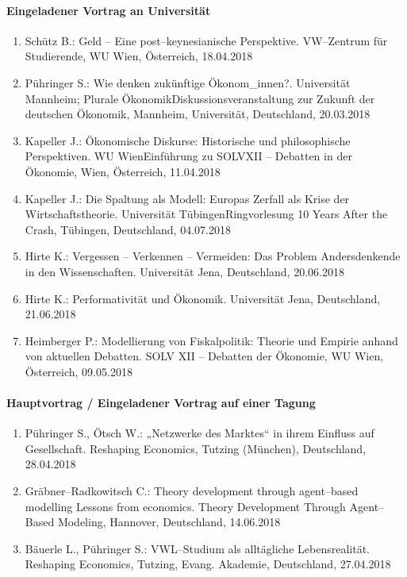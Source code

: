 \paragraph{Eingeladener Vortrag an Universität}
\begin{enumerate}
	\item Schütz B.: Geld -- Eine post--keynesianische Perspektive. VW--Zentrum für Studierende, WU Wien, Österreich, 18.04.2018
	\item Pühringer S.: Wie denken zukünftige Ökonom\_innen?. Universität Mannheim; Plurale ÖkonomikDiskussionsveranstaltung zur Zukunft der deutschen Ökonomik, Mannheim, Universität, Deutschland, 20.03.2018
	\item Kapeller J.: Ökonomische Diskurse: Historische und philosophische Perspektiven. WU WienEinführung zu SOLVXII -- Debatten in der Ökonomie, Wien, Österreich, 11.04.2018
	\item Kapeller J.: Die Spaltung als Modell: Europas Zerfall als Krise der Wirtschaftstheorie. Universität TübingenRingvorlesung 10 Years After the Crash, Tübingen, Deutschland, 04.07.2018
	\item Hirte K.: Vergessen – Verkennen – Vermeiden: Das Problem Andersdenkende in den Wissenschaften. Universität Jena, Deutschland, 20.06.2018
	\item Hirte K.: Performativität und Ökonomik. Universität Jena, Deutschland, 21.06.2018
	\item Heimberger P.: Modellierung von Fiskalpolitik: Theorie und Empirie anhand von aktuellen Debatten. SOLV XII – Debatten der Ökonomie, WU Wien, Österreich, 09.05.2018
\end{enumerate}
\paragraph{Hauptvortrag / Eingeladener Vortrag auf einer Tagung}
\begin{enumerate}
	\item Pühringer S., Ötsch W.: „Netzwerke des Marktes“ in ihrem Einfluss auf Gesellschaft. Reshaping Economics, Tutzing (München), Deutschland, 28.04.2018
	\item Gräbner--Radkowitsch C.: Theory development through agent--based modelling Lessons from economics. Theory Development Through Agent--Based Modeling, Hannover, Deutschland, 14.06.2018
	\item Bäuerle L., Pühringer S.: VWL--Studium als alltägliche Lebensrealität. Reshaping Economics, Tutzing, Evang. Akademie, Deutschland, 27.04.2018
\end{enumerate}
